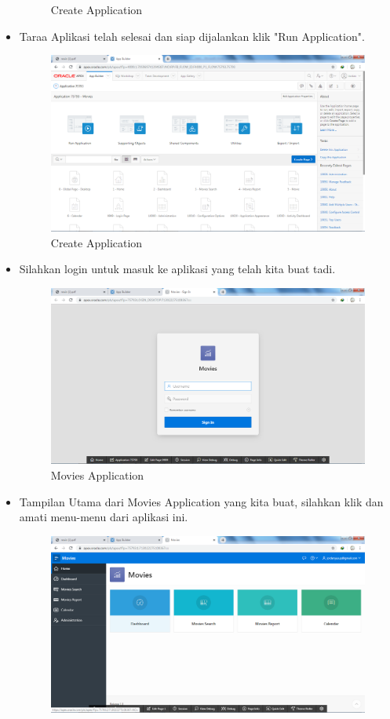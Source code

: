 \documentclass[12pt, times new roman]{article}
\begin{document}
\begin{itemize}
\begin{figure}[!htpb]
	\caption{Create Application}
\end{figure}
\item Taraa Aplikasi telah selesai dan siap dijalankan klik "Run Application".
\begin{figure}[!htpb]
	\centering
	\includegraphics[width=12cm]{figures/Screenshot_7.png}
	\caption{Create Application}
\end{figure}
\item Silahkan login untuk masuk ke aplikasi yang telah kita buat tadi.
\begin{figure}[!htpb]
	\centering
	\includegraphics[width=12cm]{figures/Screenshot_8.png}
	\caption{Movies Application}
\end{figure}
\item Tampilan Utama dari Movies Application yang kita buat, silahkan klik dan amati menu-menu dari aplikasi ini.
\begin{figure}[!htpb]
	\centering
	\includegraphics[width=12cm]{figures/Screenshot_9.png}

\end{figure}
\end{itemize}
\end{document}
